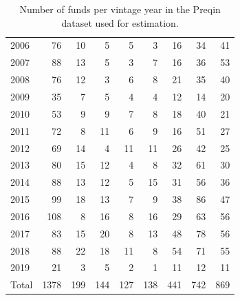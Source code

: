 \documentclass[12pt]{article}
\begin{document}
\begin{table}[ht]
\begin{tabular}{lrrrrrrrr}
  2006 &  76 &  10 &   5 &   5 &   3 &  16 &  34 &  41 \\ 
  2007 &  88 &  13 &   5 &   3 &   7 &  16 &  36 &  53 \\ 
  2008 &  76 &  12 &   3 &   6 &   8 &  21 &  35 &  40 \\ 
  2009 &  35 &   7 &   5 &   4 &   4 &  12 &  14 &  20 \\ 
  2010 &  53 &   9 &   9 &   7 &   8 &  18 &  40 &  21 \\ 
  2011 &  72 &   8 &  11 &   6 &   9 &  16 &  51 &  27 \\ 
  2012 &  69 &  14 &   4 &  11 &  11 &  26 &  42 &  25 \\ 
  2013 &  80 &  15 &  12 &   4 &   8 &  32 &  61 &  30 \\ 
  2014 &  88 &  13 &  12 &   5 &  15 &  31 &  56 &  36 \\ 
  2015 &  99 &  18 &  13 &   7 &   9 &  38 &  86 &  47 \\ 
  2016 & 108 &   8 &  16 &   8 &  16 &  29 &  63 &  56 \\ 
  2017 &  83 &  15 &  20 &   8 &  13 &  48 &  78 &  56 \\ 
  2018 &  88 &  22 &  18 &  11 &   8 &  54 &  71 &  55 \\ 
  2019 &  21 &   3 &   5 &   2 &   1 &  11 &  12 &  11 \\ 
\hline
  Total & 1378 & 199 & 144 & 127 & 138 & 441 & 742 & 869 \\ 
   \hline
\hline
\end{tabular}
\caption{Number of funds per vintage year in the Preqin dataset used for estimation.} 
\label{tab:preqin_data}
\end{table}
\end{document}
